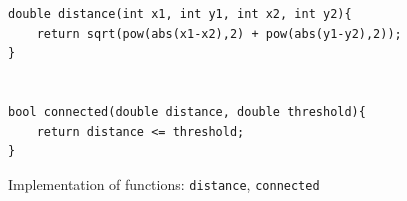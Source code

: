 \begin{figure}[H]
\caption{Implementation of functions: \texttt{distance}, \texttt{connected}}
\begin{lstlisting}[style=C++]
double distance(int x1, int y1, int x2, int y2){
    return sqrt(pow(abs(x1-x2),2) + pow(abs(y1-y2),2));
}


bool connected(double distance, double threshold){
    return distance <= threshold;
}
\end{lstlisting}
\label{fig:update_2}
\end{figure}